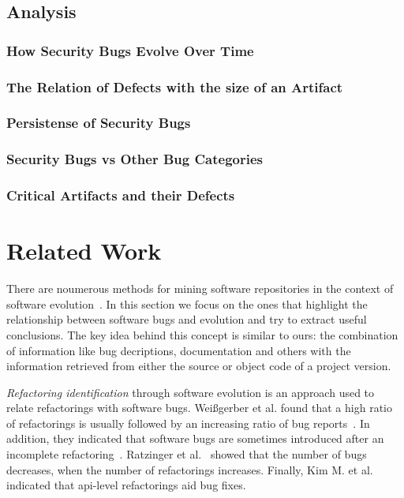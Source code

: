 \documentclass[conference]{IEEEtran}
\begin{document}
\subsection{Analysis}
\label{sec:analysis}

\subsubsection{How Security Bugs Evolve Over Time}

\subsubsection{The Relation of Defects with the size of an Artifact}

\subsubsection{Persistense of Security Bugs}

\subsubsection{Security Bugs {\sc vs} Other Bug Categories}

\subsubsection{Critical Artifacts and their Defects}

\section{Related Work}
\label{sec:rel}

There are noumerous methods for mining software repositories in the context
of software evolution~\cite{KCM07}. In this section we focus on the ones
that highlight the relationship between software bugs and evolution and try to
extract useful conclusions. The key idea behind this concept is
similar to ours: the combination of information like bug decriptions,
documentation and others with the information retrieved from either the source
or object code of a project version.

{\it Refactoring identification} through software evolution is an approach used to
relate refactorings with software bugs. Wei{\ss}gerber et al. found that a high
ratio of refactorings is usually followed by an increasing ratio of bug
reports~\cite{WD06}. In addition, they indicated that software bugs are sometimes introduced
after an incomplete refactoring~\cite{GW05}.
Ratzinger et al.~\cite{RSG08} showed that the number of bugs decreases, when the number of
refactorings increases. Finally, Kim M. et al.~\cite{KCK11} indicated that {\sc api}-level
refactorings aid bug fixes.
\end{document}
